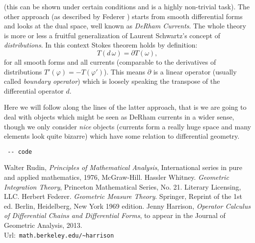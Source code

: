 \documentclass[12pt,a4paper]{article}
\begin{document}
(this can be shown under certain conditions and is a highly non-trivial
task). The other approach (as described by Federer \cite{GMT}) starts
from smooth differential forms and looks at the dual space, well known
as {\em DeRham Currents}. The whole theory is more or less a fruitful
generalization of Laurent Schwartz's concept of {\em distributions}.
In this context Stokes theorem holds by definition:
\begin{displaymath}
      T(d\,\omega) = \partial T (\omega),
\end{displaymath}
for all smooth forms and all currents (comparable to the derivatives
of distributions $T'(\varphi)=-T(\varphi')$). This means $\partial$ is
a linear operator (usually called {\em boundary operator}) which is
loosely speaking the transpose of the differential operator $d$.

Here we will follow along the lines of the latter approach, that is we
are going to deal with objects which might be seen as DeRham currents
in a wider sense, though we only consider {\em nice} objects (currents
form a really huge space and many elements look quite bizarre) which
have some relation to differential geometry.



\begin{lstlisting}
 -- code
\end{lstlisting}

%
% 
\begin{thebibliography}{1}
%
 Walter Rudin,
  {\em Principles of Mathematical Analysis},
  International series in pure and applied mathematics,
  1976, McGraw-Hill.
 Hassler Whitney. {\em Geometric Integration Theory},
  Princeton Mathematical Series, No. 21. Literary Licensing, LLC.
 Herbert Federer. {\em Geometric Measure Theory}. Springer,        
  Reprint of the 1st ed. Berlin, Heidelberg, New York 1969 edition.
 Jenny Harrison, {\em Operator Calculus of Differential
  Chains and Differential Forms}, to appear in the Journal of Geometric
  Analysis, 2013. \\
  Url:\ {\small {\tt math.berkeley.edu/\textasciitilde harrison}}
\end{thebibliography}
%
\end{document}
